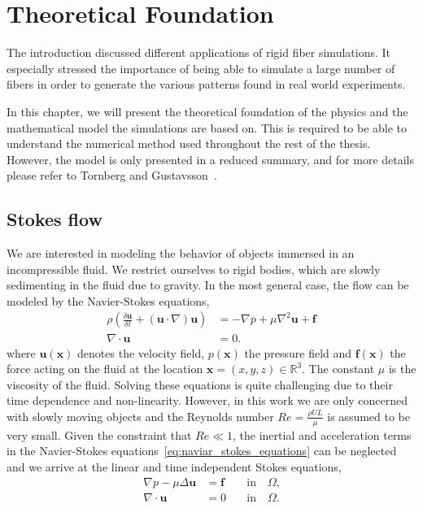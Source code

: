 \chapter{Theoretical Foundation}
\label{cha:theoretical_foundation}
The introduction discussed different applications of rigid fiber simulations. It especially stressed the importance of being able to simulate a large number of fibers in order to generate the various patterns found in real world experiments.

In this chapter, we will present the theoretical foundation of the physics and the mathematical model the simulations are based on. This is required to be able to understand the numerical method used throughout the rest of the thesis. However, the model is only presented in a reduced summary, and for more details please refer to Tornberg and Gustavsson~\cite{Tornberg2006}.

\section{Stokes flow}
\label{sec:stokes_flow}

We are interested in modeling the behavior of objects immersed in an incompressible fluid. We restrict ourselves to rigid bodies, which are slowly sedimenting in the fluid due to gravity. In the most general case, the flow can be modeled by the Navier-Stokes equations,
\begin{equation}
  \label{eq:naviar_stokes_equations}
  \begin{aligned}
    \rho\left(\frac{\delta \mathbf{u}}{\delta t} + (\mathbf{u} \cdot \nabla)\mathbf{u}\right) &= -\nabla p + \mu\nabla^2\mathbf{u} + \mathbf{f} \\
    \nabla \cdot \mathbf{u} &= 0 \text{.}
  \end{aligned}
\end{equation}
where $\mathbf{u}(\mathbf{x})$ denotes the velocity field, $p(\mathbf{x})$ the pressure field and $\mathbf{f}(\mathbf{x})$ the force acting on the fluid at the location $\mathbf{x} = (x,y,z) \in \mathbb{R}^3$. The constant $\mu$ is the viscosity of the fluid. Solving these equations is quite challenging due to their time dependence and non-linearity. However, in this work we are only concerned with slowly moving objects and the Reynolds number $Re = \frac{\rho U L}{\mu}$ is assumed to be very small. Given the constraint that $Re \ll 1$, the inertial and acceleration terms in the Navier-Stokes equations~\eqref{eq:naviar_stokes_equations} can be neglected and we arrive at the linear and time independent Stokes equations,
\begin{equation}
  \label{eq:stokes_equations}
  \begin{aligned}
    \nabla p - \mu \Delta \mathbf{u} &= \mathbf{f} \quad &\text{in} \quad \Omega \text{,}\\
    \nabla \cdot \mathbf{u} &= 0 \quad &\text{in} \quad \Omega \text{.}
  \end{aligned}
\end{equation}

